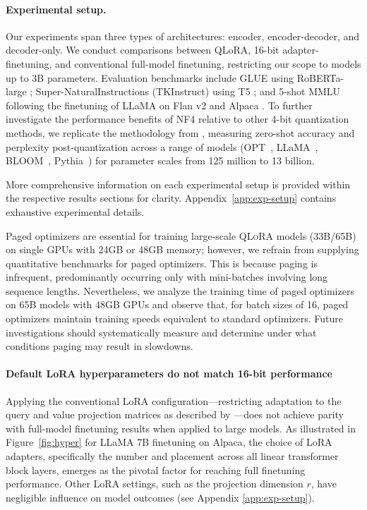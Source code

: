 \paragraph{Experimental setup.} Our experiments span three types of architectures: encoder, encoder-decoder, and decoder-only. We conduct comparisons between QLoRA, 16-bit adapter-finetuning, and conventional full-model finetuning, restricting our scope to models up to 3B parameters. Evaluation benchmarks include GLUE \citep{wang2018glue} using RoBERTa-large \citep{liu2019roberta}; Super-NaturalInstructions (TKInstruct) \citep{wang2022super} using T5 \citep{t5}; and 5-shot MMLU \citep{hendrycksmeasuring} following the finetuning of LLaMA on Flan v2 \citep{longpre2023flan} and Alpaca \citep{alpaca}. To further investigate the performance benefits of NF4 relative to other 4-bit quantization methods, we replicate the methodology from \citet{dettmers2022case}, measuring zero-shot accuracy and perplexity post-quantization across a range of models (OPT~\citep{zhang2022opt}, LLaMA~\citep{touvron2023llama}, BLOOM~\citep{scao2022bloom}, Pythia~\citep{biderman2023pythia}) for parameter scales from 125 million to 13 billion.

More comprehensive information on each experimental setup is provided within the respective results sections for clarity. Appendix~\ref{app:exp-setup} contains exhaustive experimental details.

Paged optimizers are essential for training large-scale \textsc{QLoRA} models (33B/65B) on single GPUs with 24GB or 48GB memory; however, we refrain from supplying quantitative benchmarks for paged optimizers. This is because paging is infrequent, predominantly occurring only with mini-batches involving long sequence lengths. Nevertheless, we analyze the training time of paged optimizers on 65B models with 48GB GPUs and observe that, for batch sizes of 16, paged optimizers maintain training speeds equivalent to standard optimizers. Future investigations should systematically measure and determine under what conditions paging may result in slowdowns.

\paragraph{Default LoRA hyperparameters do not match 16-bit performance}

Applying the conventional LoRA configuration—restricting adaptation to the query and value projection matrices as described by \citet{hu2021lora}—does not achieve parity with full-model finetuning results when applied to large models. As illustrated in Figure~\ref{fig:hyper} for LLaMA 7B finetuning on Alpaca, the choice of LoRA adapters, specifically the number and placement across all linear transformer block layers, emerges as the pivotal factor for reaching full finetuning performance. Other LoRA settings, such as the projection dimension $r$, have negligible influence on model outcomes (see Appendix \ref{app:exp-setup}).

